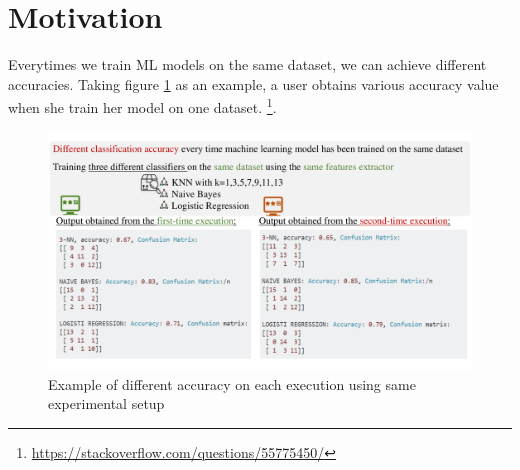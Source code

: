 \section{Motivation}
\label{sec:motivation}
Everytimes we train ML models on the same dataset, we can achieve different accuracies. Taking figure \ref{fig:motiv} as an example, a user obtains various accuracy value when she train her model on one dataset. \footnote{\small \url{https://stackoverflow.com/questions/55775450/}}.
\begin{figure}[h]
	\includegraphics[width=\linewidth]{motivfigure.pdf}
	\caption{Example of different accuracy on each execution using same experimental setup}
	\label{fig:motiv}
\end{figure}

